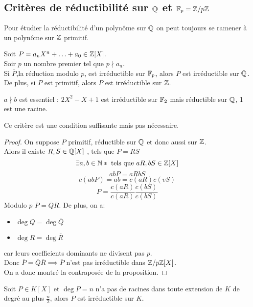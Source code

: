 \subsection{Critères de réductibilité sur $\mathbb{Q}$ et $\mathbb{F}_p = \mathbb{Z}/p\mathbb{Z}$}
Pour étudier la réductibilité d'un polynôme sur $\mathbb{Q}$ on peut toujours se ramener à un
polynôme sur $\mathbb{Z}$ primitif.



\begin{prop}
	Soit $P = a_nX^n + \ldots + a_0 \in \mathbb{Z}[X]$.\\
	Soir $p$ un nombre premier tel que $p \nmid a_n$.\\
	Si $\bar{P}$,la réduction modulo $p$, est irréductible sur $\mathbb{F}_p$, alors $P$ est irréductible sur $\mathbb{Q}$.
	De plus, si $P$ est primitif, alors $P$ est irréductible sur $\mathbb{Z}$.
\end{prop}


\begin{remarque}
	$a \nmid b$ est essentiel : $2X^2 - X + 1$ est irréductible sur $\mathbb{F}_2$ mais réductible sur $\mathbb{Q}$, 1 est une racine.
\end{remarque}

\begin{remarque}
	Ce critère est une condition suffisante mais pas nécessaire.\\
\end{remarque}


\begin{proof}
	On suppose $P$ primitif, réductible sur $\mathbb{Q}$ et donc aussi sur $\mathbb{Z}$.\\
	Alors il existe $R, S \in \mathbb{Q}[X]$ , tels que $P = RS$
	$$ \exists a, b \in \mathbb{N}* \text{ tels que } aR, bS \in \mathbb{Z}[X]$$
	$$ abP = aRbS$$
	$$ c(abP) = ab = c(aR)c(vS) $$
	$$P =   \frac{c(aR)}{c(aR)} \frac{c(bS)}{c(bS)}$$
	Modulo $p$ $\bar{P} = \bar{Q}\bar{R}$.
	De plus, on a:
	\begin{itemize}
		\item $\deg Q = \deg \bar{Q}$
		\item $\deg R = \deg \bar{R}$

	\end{itemize}
	car leurs coefficients dominants ne divisent pas $p$.\\
	Donc $\bar{P} = \bar{Q}\bar{R} \implies \bar{P}$ n'est pas irréductible dans $\mathbb{Z}/p\mathbb{Z}[X]$.\\
	On a donc montré la contraposée de la proposition.
\end{proof}


\begin{prop}
	Soit $P \in K[X]$ et $\deg P = n$ n'a pas de racines dans toute extension
	de $K$ de degré au plus $\frac{n}{2}$, alors $P$ est irréductible sur $K$.
\end{prop}

